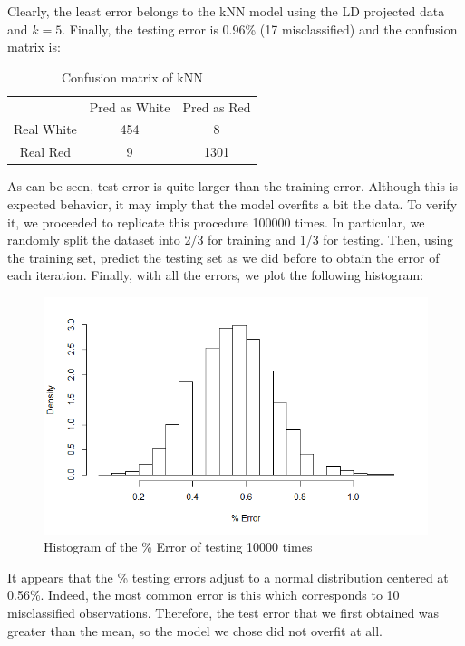 \documentclass[10pt]{article}
\begin{document}
Clearly, the least error belongs to the kNN model using the LD projected data and $k=5$. Finally, the testing error is 0.96\% (17 misclassified) and the confusion matrix is:

\begin{table}[H]
\centering
\caption{Confusion matrix of kNN}
\begin{tabular}{ccc}
 & Pred as White & Pred as Red \\
Real White & 454 & 8 \\
Real Red  & 9 & 1301
\end{tabular}
\end{table}

As can be seen, test error is quite larger than the training error. Although this is expected behavior, it may imply that the model overfits a bit the data. To verify it, we proceeded to replicate this procedure 100000 times. In particular, we randomly split the dataset into 2/3 for training and 1/3 for testing. Then, using the training set, predict the testing set as we did before to obtain the error of each iteration. Finally, with all the errors, we plot the following histogram:

\begin{figure}[H]
\centering
\caption{Histogram of the \% Error of testing 10000 times}
\includegraphics[scale=0.5]{histogramaErrors}
\end{figure}

It appears that the \% testing errors adjust to a normal distribution centered at 0.56\%. Indeed, the most common error is this which corresponds to 10 misclassified observations. Therefore, the test error that we first obtained was greater than the mean, so the model we chose did not overfit at all.
\end{document}
